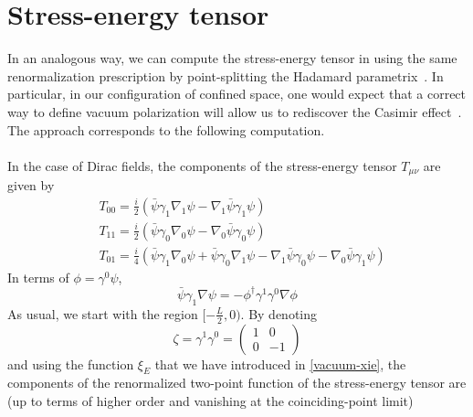 \section{Stress-energy tensor}
In an analogous way,
we can compute the stress-energy tensor in using the same renormalization prescription by point-splitting \wrt the Hadamard parametrix~\cite{Dappiaggi2009}.
In particular, in our configuration of confined space, one would expect that a correct way to define vacuum polarization will allow us to rediscover the Casimir effect~\cite{Casimir1948}.
The approach corresponds to the following computation.
\\\\
In the case of Dirac fields,
the components of the stress-energy tensor $T_{\mu\nu}$ are given by
\begin{equation}
\begin{split}
& T_{00} = \frac{i}{2} (\bar{\psi} \gamma_1 \nabla_1 \psi - \nabla_1 \bar{\psi}\gamma_1 \psi)  \\
& T_{11} = \frac{i}{2} (\bar{\psi} \gamma_0 \nabla_0 \psi - \nabla_0 \bar{\psi}\gamma_0 \psi)  \\
& T_{01} = \frac{i}{4} (\bar{\psi} \gamma_1 \nabla_0 \psi +\bar{\psi} \gamma_0 \nabla_1 \psi - \nabla_1 \bar{\psi}\gamma_0 \psi - \nabla_0 \bar{\psi}\gamma_1 \psi)  
\end{split}
\end{equation}
In terms of $\phi = \gamma^0 \psi$, 
\begin{equation*}
\bar{\psi} \gamma_1 \nabla \psi = - \phi^\dagger \gamma^1 \gamma^0 \nabla \phi
\end{equation*}
As usual, we start with the region $[-\frac{L}{2}, 0)$. By denoting
\begin{equation*}
\zeta = \gamma^1 \gamma^0 = \begin{pmatrix}
1 & 0 \\
0 & -1
\end{pmatrix}
\end{equation*}
and using the function $\xi_E$ that we have introduced in \cref{vacuum-xie}, 
the components of the renormalized two-point function of the stress-energy tensor are (up to terms of higher order and vanishing at the coinciding-point limit)
